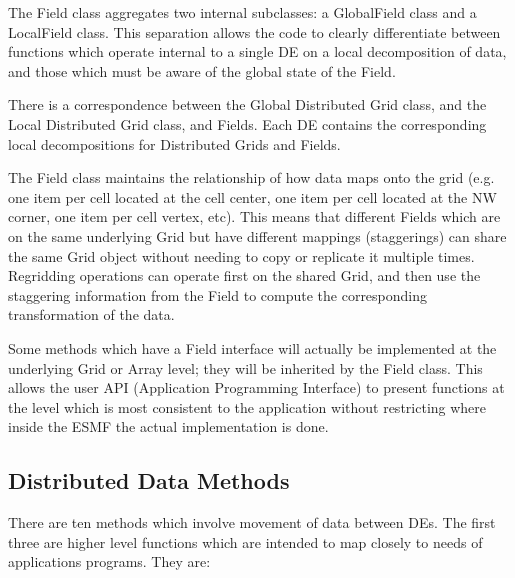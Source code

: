 



The Field class aggregates two internal subclasses: a GlobalField class
and a LocalField class.  This separation allows the code to clearly
differentiate between functions which operate internal to a single DE
on a local decomposition of data, 
and those which must be aware of the
global state of the Field.  
 
There is a correspondence between the Global Distributed Grid class,
and the Local Distributed Grid class, and Fields.  Each DE contains
the corresponding local decompositions for Distributed Grids and Fields.

The Field class maintains the relationship of
how data maps onto the grid (e.g. one item per cell located at
the cell center, one item per cell located at the NW corner, 
one item per cell vertex, etc).  This means that different Fields
which are on the same underlying Grid but have different
mappings (staggerings) can share the same Grid object without
needing to copy or replicate it multiple times.  Regridding
operations can operate first on the shared Grid, and then
use the staggering information from the Field to compute the
corresponding transformation of the data.

Some methods which have a Field interface will actually be
implemented at the underlying Grid or Array level; they
will be inherited by the Field class.  This allows the user
API (Application Programming Interface) to present functions at
the level which is most consistent to the application without
restricting where inside the ESMF the actual implementation
is done.



\subsection{Distributed Data Methods}

There are ten methods which involve movement of data between DEs.
The first three are higher level functions which are intended to
map closely to needs of applications programs.  They are:

